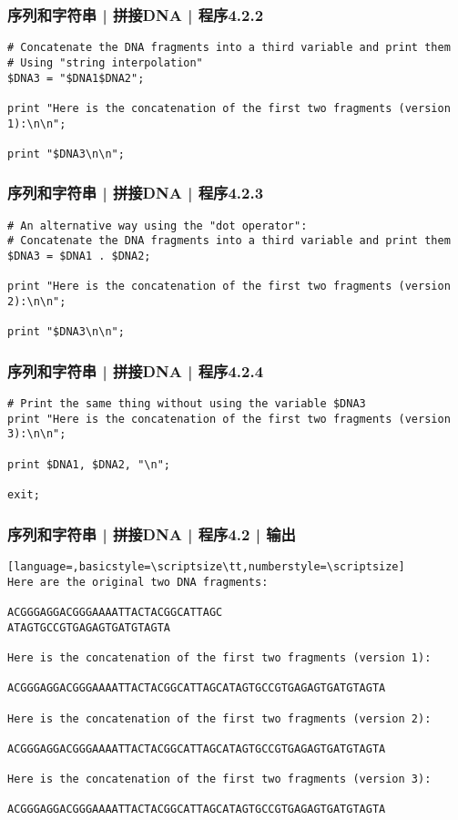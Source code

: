 \begin{frame}[fragile,label=exam4.2.2]
  \frametitle{序列和字符串 | 拼接DNA | 程序4.2.2}
  \vspace{-1.5em}
\begin{lstlisting}[firstnumber=15]
# Concatenate the DNA fragments into a third variable and print them
# Using "string interpolation"
$DNA3 = "$DNA1$DNA2";

print "Here is the concatenation of the first two fragments (version 1):\n\n";

print "$DNA3\n\n";
\end{lstlisting}
\end{frame}

\begin{frame}[fragile,label=exam4.2.3]
  \frametitle{序列和字符串 | 拼接DNA | 程序4.2.3}
  \vspace{-1.5em}
\begin{lstlisting}[firstnumber=23]
# An alternative way using the "dot operator":
# Concatenate the DNA fragments into a third variable and print them
$DNA3 = $DNA1 . $DNA2;

print "Here is the concatenation of the first two fragments (version 2):\n\n";

print "$DNA3\n\n";
\end{lstlisting}
\end{frame}

\begin{frame}[fragile,label=exam4.2.4]
  \frametitle{序列和字符串 | 拼接DNA | 程序4.2.4}
  \vspace{-1.5em}
\begin{lstlisting}[firstnumber=31]
# Print the same thing without using the variable $DNA3
print "Here is the concatenation of the first two fragments (version 3):\n\n";

print $DNA1, $DNA2, "\n";

exit;
\end{lstlisting}
\end{frame}

\begin{frame}[fragile]
  \frametitle{序列和字符串 | 拼接DNA | 程序4.2 | 输出}
  \vspace{-1.5em}
\begin{lstlisting}[language=,basicstyle=\scriptsize\tt,numberstyle=\scriptsize]
Here are the original two DNA fragments:

ACGGGAGGACGGGAAAATTACTACGGCATTAGC
ATAGTGCCGTGAGAGTGATGTAGTA

Here is the concatenation of the first two fragments (version 1):

ACGGGAGGACGGGAAAATTACTACGGCATTAGCATAGTGCCGTGAGAGTGATGTAGTA

Here is the concatenation of the first two fragments (version 2):

ACGGGAGGACGGGAAAATTACTACGGCATTAGCATAGTGCCGTGAGAGTGATGTAGTA

Here is the concatenation of the first two fragments (version 3):

ACGGGAGGACGGGAAAATTACTACGGCATTAGCATAGTGCCGTGAGAGTGATGTAGTA
\end{lstlisting}
\end{frame}

